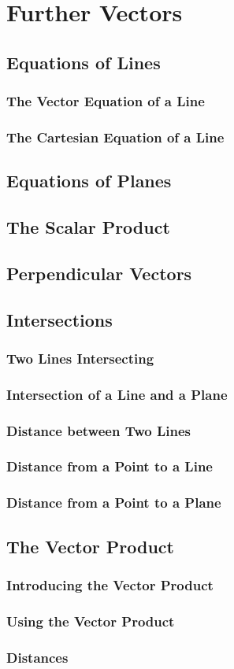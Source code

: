 \documentclass[../alevelmaths.tex]{subfiles}
\begin{document}
\chapter{Further Vectors}
\section{Equations of Lines}
\subsection*{The Vector Equation of a Line}
\subsection*{The Cartesian Equation of a Line}
\section{Equations of Planes}
\section{The Scalar Product}
\section{Perpendicular Vectors}
\section{Intersections}
\subsection*{Two Lines Intersecting}
\subsection*{Intersection of a Line and a Plane}
\subsection*{Distance between Two Lines}
\subsection*{Distance from a Point to a Line}
\subsection*{Distance from a Point to a Plane}
\section{The Vector Product}
\subsection*{Introducing the Vector Product}
\subsection*{Using the Vector Product}
\subsection*{Distances}
\end{document}
